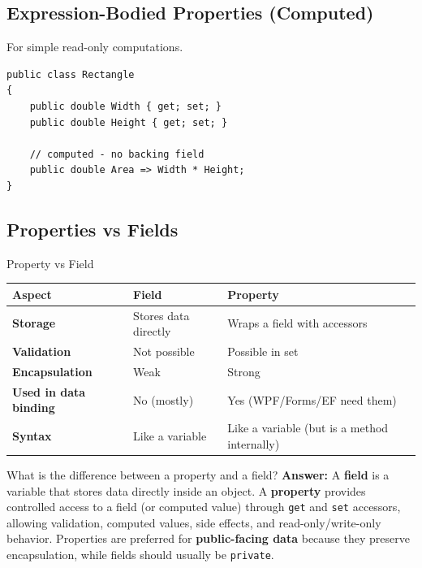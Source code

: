 \documentclass[11pt,a4paper]{article}
\newcommand{\rowcolortop}{\rowcolor{tableHead}\color{white}\bfseries}
\newcommand{\rowcolorlight}{\rowcolor{tableAlt}}
\begin{document}
\subsection{Expression-Bodied Properties (Computed)}

For simple read-only computations.

\begin{lstlisting}[caption={Expression-bodied (computed) properties}]
public class Rectangle
{
    public double Width { get; set; }
    public double Height { get; set; }

    // computed - no backing field
    public double Area => Width * Height;
}
\end{lstlisting}

\subsection{Properties vs Fields}

\begin{compareBox}{Property vs Field}
\begin{tabularx}{\linewidth}{|>{\bfseries}p{3.5cm}|X|X|}
\hline
\rowcolortop \color{white}Aspect & \color{white}Field & \color{white}Property \\
\hline
Storage    & Stores data directly & Wraps a field with accessors \\
\rowcolorlight
Validation & Not possible & Possible in set \\
Encapsulation & Weak & Strong \\
\rowcolorlight
Used in data binding & No (mostly) & Yes (WPF/Forms/EF need them) \\
Syntax & Like a variable & Like a variable (but is a method internally) \\
\hline
\end{tabularx}
\end{compareBox}

\begin{intqBox}{What is the difference between a property and a field?}
\textbf{Answer:} A \textbf{field} is a variable that stores data directly inside an object. A \textbf{property} provides controlled access to a field (or computed value) through \texttt{get} and \texttt{set} accessors, allowing validation, computed values, side effects, and read-only/write-only behavior. Properties are preferred for \textbf{public-facing data} because they preserve encapsulation, while fields should usually be \texttt{private}.
\end{intqBox}
\end{document}
